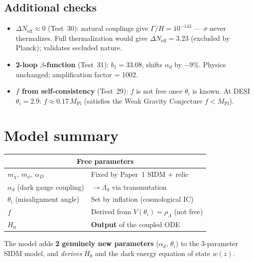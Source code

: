 \documentclass[11pt,a4paper]{article}
\newcommand{\Mpl}{M_{\mathrm{Pl}}}
\newcommand{\Ld}{\Lambda_d}
\begin{document}
\subsection{Additional checks}
\begin{itemize}[nosep]
  \item \textbf{$\Delta N_{\mathrm{eff}}\approx 0$} (Test~30): natural couplings give $\Gamma/H = 10^{-143}$ --- $\sigma$ never thermalizes.
  Full thermalization would give $\Delta N_{\mathrm{eff}}=3.23$ (excluded by Planck); validates secluded nature.
  \item \textbf{2-loop $\beta$-function} (Test~31): $b_1=33.08$, shifts $\alpha_d$ by $-9\%$. Physics unchanged; amplification factor = 1002.
  \item \textbf{$f$ from self-consistency} (Test~29): $f$ is not free once $\theta_i$ is known. At DESI $\theta_i=2.9$: $f\approx0.17\,\Mpl$ (satisfies the Weak Gravity Conjecture $f<\Mpl$).
\end{itemize}

\section{Model summary}

\begin{center}
\begin{tabular}{@{}ll@{}}
\toprule
\multicolumn{2}{c}{\textbf{Free parameters}} \\
\midrule
$m_\chi,\,m_\phi,\,\alpha_D$ & Fixed by Paper~1 SIDM + relic \\
$\alpha_d$ (dark gauge coupling) & $\to\Ld$ via transmutation \\
$\theta_i$ (misalignment angle) & Set by inflation (cosmological IC) \\
\midrule
$f$ & Derived from $V(\theta_i)=\rho_\Lambda$ (not free) \\
$H_0$ & \textbf{Output} of the coupled ODE \\
\bottomrule
\end{tabular}
\end{center}

\medskip
\noindent
The model adds \textbf{2 genuinely new parameters} ($\alpha_d$, $\theta_i$) to the 3-parameter SIDM model, and \emph{derives} $H_0$ and the dark energy equation of state $w(z)$.

\end{document}
